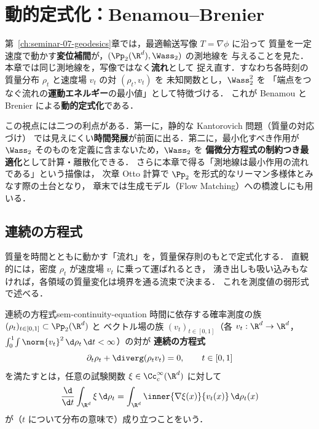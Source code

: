 \chapter{動的定式化：Benamou--Brenier}
\label{ch:seminar-08-benamou-brenier}

第~\ref{ch:seminar-07-geodesics}章では，最適輸送写像 $T=\nabla\phi$ に沿って
質量を一定速度で動かす\textbf{変位補間}が，$(\Pp_2(\R^d),\Wass_2)$ の測地線を
与えることを見た．本章では同じ測地線を，写像ではなく\textbf{流れ}として
捉え直す．すなわち各時刻の質量分布 $\rho_t$ と速度場 $v_t$ の対 $(\rho_t,v_t)$ を
未知関数とし，$\Wass_2^2$ を
「端点をつなぐ流れの\textbf{運動エネルギー}の最小値」として特徴づける．
これが Benamou と Brenier による\textbf{動的定式化}である．

この視点には二つの利点がある．第一に，静的な Kantorovich 問題（質量の対応づけ）
では見えにくい\textbf{時間発展}が前面に出る．第二に，最小化すべき作用が
$\Wass_2$ そのものを定義に含まないため，$\Wass_2$ を
\textbf{偏微分方程式の制約つき最適化}として計算・離散化できる．
さらに本章で得る「測地線は最小作用の流れである」という描像は，
次章 Otto 計算で $\Pp_2$ を形式的なリーマン多様体とみなす際の土台となり，
章末では生成モデル（Flow Matching）への橋渡しにも用いる．

\section{連続の方程式}
\label{sec:sem-continuity-equation}

質量を時間とともに動かす「流れ」を，質量保存則のもとで定式化する．
直観的には，密度 $\rho_t$ が速度場 $v_t$ に乗って運ばれるとき，
湧き出しも吸い込みもなければ，各領域の質量変化は境界を通る流束で決まる．
これを測度値の弱形式で述べる．

\begin{definition}{連続の方程式}{sem-continuity-equation}
  時間に依存する確率測度の族 $(\rho_t)_{t\in[0,1]} \subset \Pp_2(\R^d)$ と
  ベクトル場の族 $(v_t)_{t\in[0,1]}$（各 $v_t : \R^d \to \R^d$，
  $\int_0^1\!\int \norm{v_t}^2\,\d\rho_t\,\d t < \infty$）の対が
  \textbf{連続の方程式}
  \[
    \partial_t \rho_t + \diverg(\rho_t v_t) = 0,
    \qquad t \in [0,1]
  \]
  を満たすとは，任意の試験関数 $\xi \in \Cc_c^\infty(\R^d)$ に対して
  \[
    \frac{\d}{\d t} \int_{\R^d} \xi\,\d\rho_t
    = \int_{\R^d} \inner{\nabla\xi(x)}{v_t(x)} \,\d\rho_t(x)
  \]
  が（$t$ について分布の意味で）成り立つことをいう．
\end{definition}

